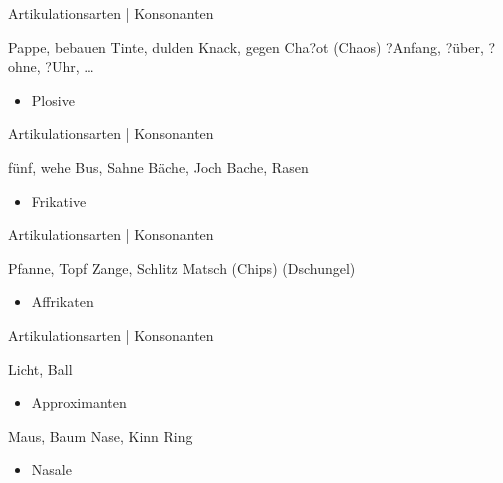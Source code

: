 \begin{frame}
  {Artikulationsarten | Konsonanten}
  \pause
  \begin{exe}
    \ex \alert{P}a\alert{pp}e, \alert{b}e\alert{b}auen
    \pause
    \ex \alert{T}in\alert{t}e, \alert{d}ul\alert{d}en
    \pause
    \ex \alert{K}na\alert{ck}, \alert{g}e\alert{g}en
    \pause
    \ex Cha\alert{?}ot (Chaos)
    \ex \alert{?}Anfang, \alert{?}über, \alert{?}ohne, \alert{?}Uhr, \dots
  \end{exe}
    \pause
    \Large
    \begin{itemize}
      \item \alert{Plosive}
    \end{itemize}
\end{frame}


\begin{frame}
  {Artikulationsarten | Konsonanten}
  \pause
  \begin{exe}
    \ex \alert{f}ün\alert{f}, \alert{w}ehe
    \pause
    \ex Bu\alert{s}, \alert{S}ahne
    \pause
    \ex Bä\alert{ch}e, \alert{J}och
    \pause
    \ex Ba\alert{ch}e, \alert{R}asen
  \end{exe}
    \pause
    \Large
    \begin{itemize}
      \item \alert{Frikative}
    \end{itemize}
\end{frame}

\begin{frame}
  {Artikulationsarten | Konsonanten}
  \pause
  \begin{exe}
    \ex \alert{Pf}anne, To\alert{pf} 
    \pause
    \ex \alert{Z}ange, Schli\alert{tz}
    \pause
    \ex Ma\alert{tsch} (\alert{Ch}ips)
    \pause
    \ex (\alert{Dsch}ungel)
  \end{exe}
    \pause
    \Large
    \begin{itemize}
      \item \alert{Affrikaten}
    \end{itemize}
\end{frame}

\begin{frame}
  {Artikulationsarten | Konsonanten}
  \pause
  \begin{exe}
    \ex \alert{L}icht, Ba\alert{ll}
  \end{exe}
    \pause
    \Large
    \begin{itemize}
      \item \alert{Approximanten}
    \end{itemize}
    \Zeile
  \pause
  \begin{exe}
    \ex \alert{M}aus, Bau\alert{m}
    \pause
    \ex \alert{N}ase, Ki\alert{nn}
    \pause
    \ex Ri\alert{ng}
  \end{exe}
    \pause
    \Large
    \begin{itemize}
      \item \alert{Nasale}
    \end{itemize}
\end{frame}


